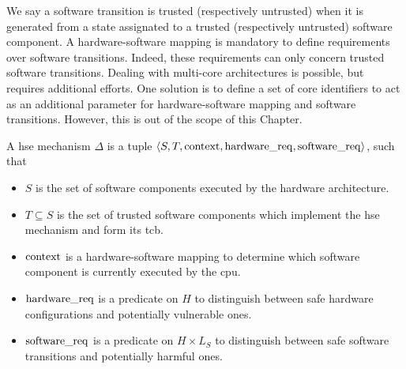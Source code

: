 We say a software transition is trusted (respectively untrusted) when it is
generated from a state assignated to a trusted (respectively untrusted) software
component.
%
A hardware-software mapping is mandatory to define requirements over software
transitions.
%
Indeed, these requirements can only concern trusted software transitions.
%
Dealing with multi-core architectures is possible, but requires additional
efforts.
%
One solution is to define a set of core identifiers to act as an additional
parameter for hardware-software mapping and software transitions.
%
However, this is out of the scope of this Chapter.

\begin{definition}
  \label{def:speccert:hse}
  A \ac{hse} mechanism $\Delta$ is a tuple
  $\langle S, T, \mathrm{context}, \mathrm{hardware\_req}, \mathrm{software\_req}
  \rangle$, such that
  \begin{itemize}
  \item $S$ is the set of software components executed by the hardware
    architecture.
  \item $T \subseteq S$ is the set of trusted software components which
    implement the \ac{hse} mechanism and form its \ac{tcb}.
  \item $\mathrm{context}$ is a hardware-software mapping to determine which
    software component is currently executed by the \ac{cpu}.
  \item $\mathrm{hardware\_req}$ is a predicate on $H$ to distinguish between safe
    hardware configurations and potentially vulnerable ones.
  \item $\mathrm{software\_req}$ is a predicate on $H \times L_S$ to distinguish
    between safe software transitions and potentially harmful ones.
  \end{itemize}
\end{definition}

